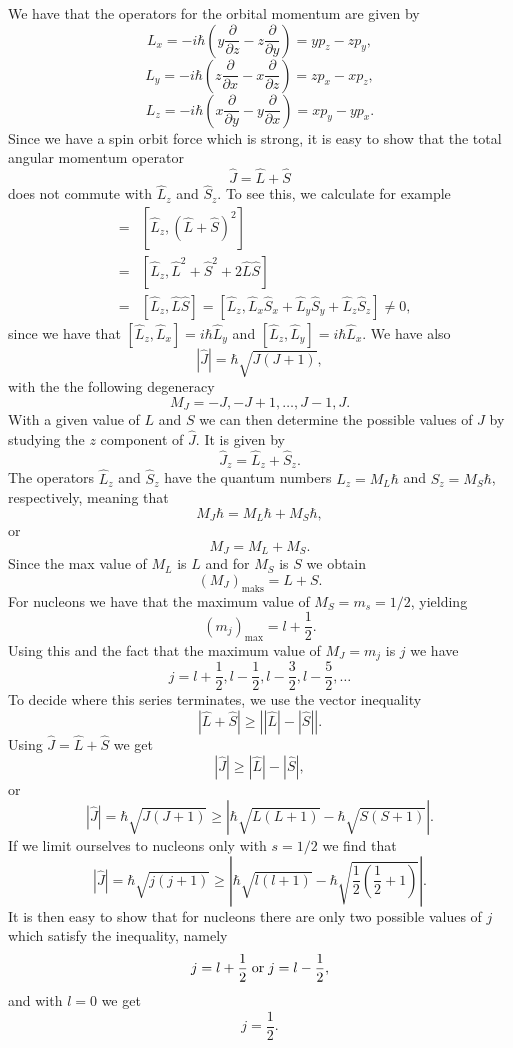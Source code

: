 \documentclass[graybox,sectrefs,envcountresetchap,open=right]{svmonodo}
\begin{document}
\noindent
We have that the operators for the orbital momentum are given by
\[
L_x=-i\hbar(y\frac{\partial }{\partial z}-z\frac{\partial }{\partial y})=
yp_z-zp_y,
\]
\[
L_y=-i\hbar(z\frac{\partial }{\partial x}-x\frac{\partial }{\partial z})= zp_x-xp_z,
\]
\[
L_z=-i\hbar(x\frac{\partial }{\partial y}-y\frac{\partial }{\partial x})=xp_y-yp_x.
\]
Since we have a spin orbit force which is strong, it is easy to show that 
the total angular momentum operator
\[
   \hat{J}=\hat{L}+\hat{S}
\]
does not commute with $\hat{L}_z$ and $\hat{S}_z$. To see this, we calculate for example
\begin{eqnarray} 
   [\hat{L}_z,\hat{J}^2]&=&[\hat{L}_z,(\hat{L}+\hat{S})^2] \\ \nonumber
   &=&[\hat{L}_z,\hat{L}^2+\hat{S}^2+2\hat{L}\hat{S}]\\ \nonumber 
   &=& [\hat{L}_z,\hat{L}\hat{S}]=[\hat{L}_z,\hat{L}_x\hat{S}_x+\hat{L}_y\hat{S}_y+\hat{L}_z\hat{S}_z]\ne 0, 
\end{eqnarray}
since we have that $[\hat{L}_z,\hat{L}_x]=i\hbar\hat{L}_y$ and $[\hat{L}_z,\hat{L}_y]=i\hbar\hat{L}_x$. 
We have also
\[
   |\hat{J}|=\hbar\sqrt{J(J+1)},
\]
with the the following degeneracy
\[
   M_J=-J, -J+1, \dots, J-1, J.
\]
With a given value of  $L$ and $S$ we can then determine the possible values of 
 $J$ by studying the $z$ component of  $\hat{J}$. 
It is given by
\[
\hat{J}_z=\hat{L}_z+\hat{S}_z.
\]
The operators $\hat{L}_z$ and $\hat{S}_z$ have the quantum numbers
$L_z=M_L\hbar$ and $S_z=M_S\hbar$, respectively, meaning that
\[
   M_J\hbar=M_L\hbar +M_S\hbar,
\]
or
\[
   M_J=M_L +M_S.
\]
Since the max value of  $M_L$ is $L$ and for  $M_S$ is $S$
we obtain
\[
   (M_J)_{\mathrm{maks}}=L+S.
\]
For nucleons we have that the maximum value of $M_S=m_s=1/2$, yielding
\[
   (m_j)_{\mathrm{max}}=l+\frac{1}{2}.
\]
Using this and the fact that the maximum value of  $M_J=m_j$ is $j$ we have
\[
   j=l+\frac{1}{2}, l-\frac{1}{2}, l-\frac{3}{2}, l-\frac{5}{2}, \dots 
\]
To decide where this series terminates, we use the vector inequality
\[
   |\hat{L}+\hat{S}| \ge \left| |\hat{L}|-|\hat{S}|\right|.
\]
Using $\hat{J}=\hat{L}+\hat{S}$ we get 
\[
   |\hat{J}| \ge |\hat{L}|-|\hat{S}|,
\]
or
\[
   |\hat{J}|=\hbar\sqrt{J(J+1)}\ge |\hbar\sqrt{L(L+1)}-
   \hbar\sqrt{S(S+1)}|.
\]
If we limit ourselves to nucleons only with $s=1/2$ we find that
\[
   |\hat{J}|=\hbar\sqrt{j(j+1)}\ge |\hbar\sqrt{l(l+1)}-
   \hbar\sqrt{\frac{1}{2}(\frac{1}{2}+1)}|.
\]
It is then easy to show that for nucleons there are only two possible values of
$j$ which satisfy the inequality, namely
\[
   j=l+\frac{1}{2}\hspace{0.1cm} \mathrm{or} \hspace{0.1cm}j=l-\frac{1}{2},
\]
and with $l=0$ we get 
\[
   j=\frac{1}{2}.
\]
\end{document}
